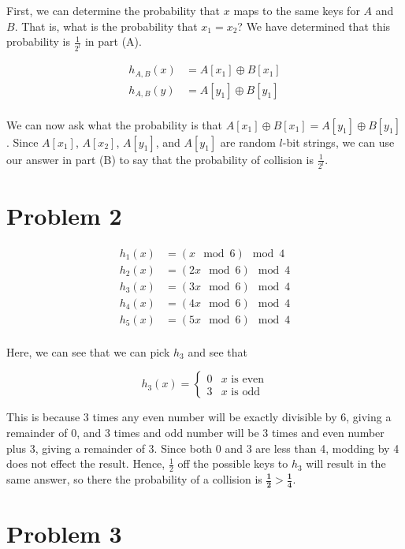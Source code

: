 \documentclass[answers, 12pt]{article}
\begin{document}
First, we can determine the probability that $x$ maps to the same keys for $A$ and $B$. That is, what is the probability that $x_1 = x_2$? We have determined that this probability is $\frac{1}{2^l}$ in part (A).

\begin{align*}
  h_{A,B}(x) &= A[x_1] \oplus B[x_1] \\
  h_{A,B}(y) &= A[y_1] \oplus B[y_1] \\
\end{align*}

We can now ask what the probability is that $A[x_1] \oplus B[x_1] =A[y_1] \oplus B[y_1]$. Since $A[x_1]$, $A[x_2]$, $A[y_1]$, and $A[y_1]$ are random $l$-bit strings, we can use our answer in part (B) to say that the probability of collision is $\frac{1}{2^l}$.


\section*{Problem 2}

\begin{align*}
  h_1(x) &= (x \mod 6) \mod 4 \\
  h_2(x) &= (2x \mod 6) \mod 4 \\
  h_3(x) &= (3x \mod 6) \mod 4 \\
  h_4(x) &= (4x \mod 6) \mod 4 \\
  h_5(x) &= (5x \mod 6) \mod 4 \\
\end{align*}

Here, we can see that we can pick $h_3$ and see that 

\[
  h_3(x) = \begin{cases}
    0 & x \text{ is even} \\
    3 & x \text{ is odd}
  \end{cases}
\]

This is because 3 times any even number will be exactly divisible by 6, giving a remainder of 0, and 3 times and odd number will be 3 times and even number plus 3, giving a remainder of 3. Since both 0 and 3 are less than 4, modding by 4 does not effect the result. Hence, $\frac{1}{2}$ off the possible keys to $h_3$ will result in the same answer, so there the probability of a collision is $\boldsymbol{\frac{1}{2} > \frac{1}{4}}$.


\section*{Problem 3}
\end{document}
